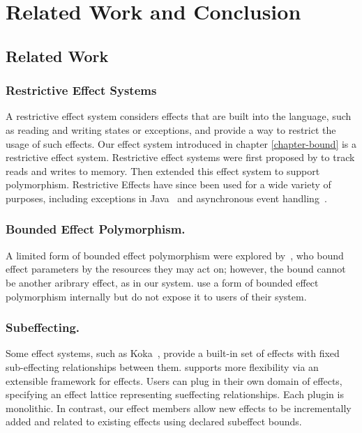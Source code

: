 
\chapter{Related Work and Conclusion}

\section{Related Work}

\subsection{Restrictive Effect Systems}
A restrictive effect system considers effects that are built into the language, such as reading and writing states or exceptions, and provide a way to restrict the usage of such effects. Our effect system introduced in chapter \ref{chapter-bound} is a restrictive effect system. Restrictive effect systems were first proposed by \citet{lucassen87} to track reads and writes to memory. Then \citet{lucassen88} extended this effect system to support polymorphism.  Restrictive Effects have since been used for a wide variety of purposes, including exceptions in Java~\cite{kiniry06} and asynchronous event handling~\cite{bracevac18}. 

\subsection{ Bounded Effect Polymorphism.}  A limited form of bounded effect polymorphism were explored by~\citet{10.5555/645393.651891}, who bound effect parameters by the resources they may act on; however, the bound cannot be another aribrary effect, as in our system.  \citet{DBLP:conf/ecoop/LongLR15} use a form of bounded effect polymorphism internally but do not expose it to users of their system.

\subsection{Subeffecting.} 
Some effect systems, such as Koka~\cite{leijen14}, provide a built-in set of effects with fixed sub-effecting relationships between them.
\citet{rytz12} supports more flexibility via an extensible framework for effects.  Users can plug in their own domain of effects, specifying an effect lattice representing sueffecting relationships.  Each plugin is monolithic.  In contrast, our effect members allow new effects to be incrementally added and related to existing effects using declared subeffect bounds.

